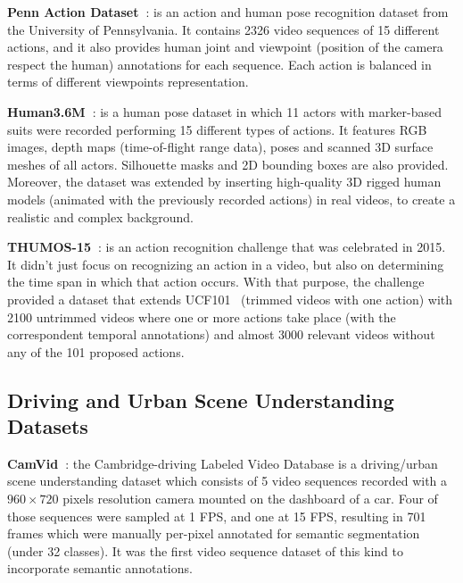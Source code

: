 \vspace*{0.1cm}\noindent\textbf{Penn Action Dataset~\cite{Zhang2013}}: is an action and human pose recognition dataset from the University of Pennsylvania. It contains \num{2326} video sequences of \num{15} different actions, and it also provides human joint and viewpoint (position of the camera respect the human) annotations for each sequence. Each action is balanced in terms of different viewpoints representation.

\vspace*{0.1cm}\noindent\textbf{Human3.6M~\cite{Ionescu2014}}: is a human pose dataset in which \num{11} actors with marker-based suits were recorded performing \num{15} different types of actions. It features RGB images, depth maps (time-of-flight range data), poses and scanned 3D surface meshes of all actors. Silhouette masks and 2D bounding boxes are also provided. Moreover, the dataset was extended by inserting high-quality 3D rigged human models (animated with the previously recorded actions) in real videos, to create a realistic and complex background.

\vspace*{0.1cm}\noindent\textbf{THUMOS-15~\cite{Idrees2017}}: is an action recognition challenge that was celebrated in 2015. It didn't just focus on recognizing an action in a video, but also on determining the time span in which that action occurs. With that purpose, the challenge provided a dataset that extends UCF101~\cite{Soomro2012} (trimmed videos with one action) with 2100 untrimmed videos where one or more actions take place (with the correspondent temporal annotations) and almost \num{3000} relevant videos without any of the \num{101} proposed actions.

\subsection{Driving and Urban Scene Understanding Datasets}
\textbf{CamVid~\cite{Brostow2008}}: the Cambridge-driving Labeled Video Database is a driving/urban scene understanding dataset which consists of \num{5} video sequences recorded with a $960 \times 720$ pixels resolution camera mounted on the dashboard of a car. Four of those sequences were sampled at \num{1} \ac{FPS}, and one at \num{15} \ac{FPS}, resulting in \num{701} frames which were manually per-pixel annotated for semantic segmentation (under \num{32} classes). It was the first video sequence dataset of this kind to incorporate semantic annotations.

